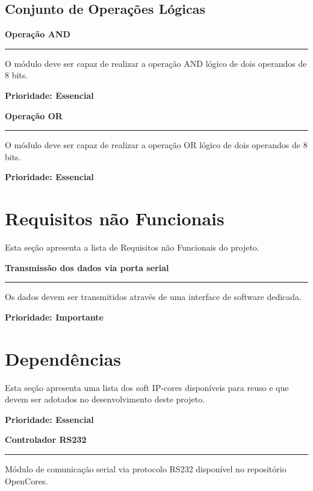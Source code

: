 \documentclass{article}
\begin{document}
  \subsection{Conjunto de Operações Lógicas} 
  
    \begin{functional}
      \item \textbf{Operação AND}\hrule
      O módulo deve ser capaz de realizar a operação AND lógico de dois operandos de 8 bits.

      \textbf{Prioridade: Essencial}

      \item \textbf{Operação OR}\hrule
      O módulo deve ser capaz de realizar a operação OR lógico de dois operandos de 8 bits.

      \textbf{Prioridade: Essencial}      
     
    \end{functional}    

  \section{Requisitos não Funcionais}
  Esta seção apresenta a lista de Requisitos não Funcionais do projeto.

  \begin{nonfunctional}
    \setcounter{enumi}{0} %
     \item \textbf{Transmissão dos dados via porta serial}\hrule
     Os dados devem ser transmitidos através de uma interface de software dedicada.
  
     \textbf{Prioridade: Importante}

  \end{nonfunctional}

\section{Dependências}
Esta seção apresenta uma lista dos soft IP-cores disponíveis para reuso e que devem ser adotados no desenvolvimento deste projeto.

\textbf{Prioridade: Essencial}

  \begin{dependencies}
    \item \textbf{Controlador RS232}\hrule
    Módulo de comunicação serial via protocolo RS232 disponível no repositório OpenCores.

\end{dependencies}  

% 
% 
\end{document}
